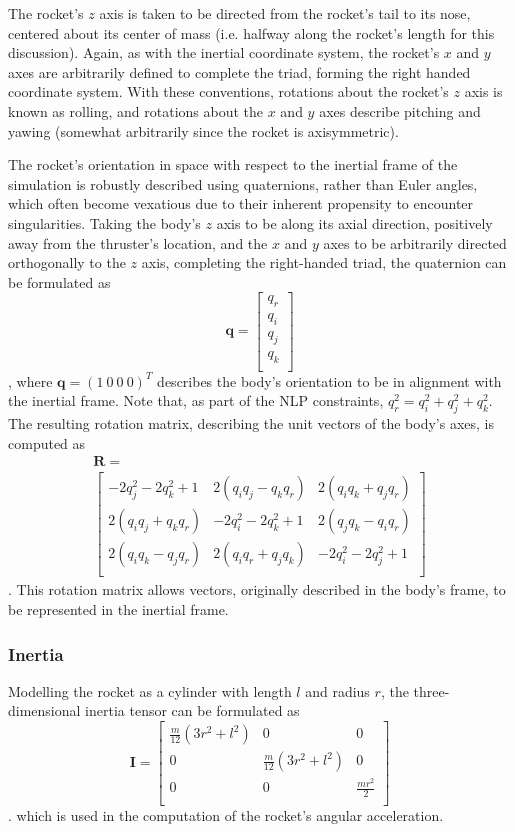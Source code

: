 \documentclass{article}
\begin{document}
The rocket's $z$ axis is taken to be directed from the rocket's tail to its nose, centered about its center of mass (i.e. halfway along the rocket's length for this discussion). Again, as with the inertial coordinate system, the rocket's $x$ and $y$ axes are arbitrarily defined to complete the triad, forming the right handed coordinate system. With these conventions, rotations about the rocket's $z$ axis is known as rolling, and rotations about the $x$ and $y$ axes describe pitching and yawing (somewhat arbitrarily since the rocket is axisymmetric).

The rocket's orientation in space with respect to the inertial frame of the simulation is robustly described using quaternions, rather than Euler angles, which often become vexatious due to their inherent propensity to encounter singularities. Taking the body's $z$ axis to be along its axial direction, positively away from the thruster's location, and the $x$ and $y$ axes to be arbitrarily directed orthogonally to the $z$ axis, completing the right-handed triad, the quaternion can be formulated as 
$$ \mathbf{q} = \left[
\begin{array}{c}
q_r \\
q_i \\
q_j \\
q_k \\
\end{array}
\right] $$
, where $\mathbf{q} = \left(1~0~0~0\right)^T$ describes the body's orientation to be in alignment with the inertial frame. Note that, as part of the NLP constraints, $q_r^2=q_i^2+q_j^2+q_k^2$. The resulting rotation matrix, describing the unit vectors of the body's axes, is computed as 
\begin{multline*}
\mathbf{R} = \\
\left[
\begin{array}{ccc}
 -2 q_j^2-2 q_k^2+1 & 2 \left(q_i q_j-q_k q_r\right) & 2 \left(q_i q_k+q_j
   q_r\right) \\
 2 \left(q_i q_j+q_k q_r\right) & -2 q_i^2-2 q_k^2+1 & 2 \left(q_j q_k-q_i
   q_r\right) \\
 2 \left(q_i q_k-q_j q_r\right) & 2 \left(q_i q_r+q_j q_k\right) & -2 q_i^2-2
   q_j^2+1 \\
\end{array}
\right]
\end{multline*}.
This rotation matrix allows vectors, originally described in the body's frame, to be represented in the inertial frame.
\subsubsection{Inertia}
Modelling the rocket as a cylinder with length $l$ and radius $r$, the three-dimensional inertia tensor can be formulated as 
$$
\mathbf{I} = \left[
\begin{array}{ccc}
 \frac{m}{12}  \left(3r^2+l^2\right) & 0 & 0 \\
 0 & \frac{m}{12}  \left(3r^2+l^2\right) & 0 \\
 0 & 0 & \frac{mr^2}{2} \\
\end{array}
\right]
$$.
which is used in the computation of the rocket's angular acceleration.
\end{document}
